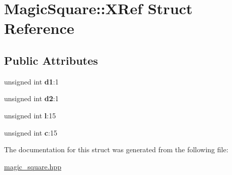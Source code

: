 \hypertarget{structMagicSquare_1_1XRef}{\section{\-Magic\-Square\-:\-:\-X\-Ref \-Struct \-Reference}
\label{structMagicSquare_1_1XRef}
}
\subsection*{\-Public \-Attributes}
\begin{DoxyCompactItemize}
\item 
\hypertarget{structMagicSquare_1_1XRef_a9da1ebfcf74bd506f8705783e92d764f}{unsigned int {\bfseries d1}\-:1}\label{structMagicSquare_1_1XRef_a9da1ebfcf74bd506f8705783e92d764f}

\item 
\hypertarget{structMagicSquare_1_1XRef_ad1d07d5c5ff273961e4329af5a8ff2d0}{unsigned int {\bfseries d2}\-:1}\label{structMagicSquare_1_1XRef_ad1d07d5c5ff273961e4329af5a8ff2d0}

\item 
\hypertarget{structMagicSquare_1_1XRef_af86bd806c544303f25ee0feca31afc57}{unsigned int {\bfseries l}\-:15}\label{structMagicSquare_1_1XRef_af86bd806c544303f25ee0feca31afc57}

\item 
\hypertarget{structMagicSquare_1_1XRef_aac7b71199e3718a13b6a7853469ace7e}{unsigned int {\bfseries c}\-:15}\label{structMagicSquare_1_1XRef_aac7b71199e3718a13b6a7853469ace7e}

\end{DoxyCompactItemize}


\-The documentation for this struct was generated from the following file\-:\begin{DoxyCompactItemize}
\item 
\hyperlink{magic__square_8hpp}{magic\-\_\-square.\-hpp}\end{DoxyCompactItemize}
